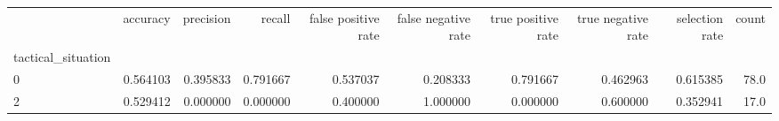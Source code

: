 \begin{tabular}{lrrrrrrrrr}
\toprule
{} &  accuracy &  precision &    recall &  false positive rate &  false negative rate &  true positive rate &  true negative rate &  selection rate &  count \\
tactical\_situation &           &            &           &                      &                      &                     &                     &                 &        \\
\midrule
0                  &  0.564103 &   0.395833 &  0.791667 &             0.537037 &             0.208333 &            0.791667 &            0.462963 &        0.615385 &   78.0 \\
2                  &  0.529412 &   0.000000 &  0.000000 &             0.400000 &             1.000000 &            0.000000 &            0.600000 &        0.352941 &   17.0 \\
\bottomrule
\end{tabular}
